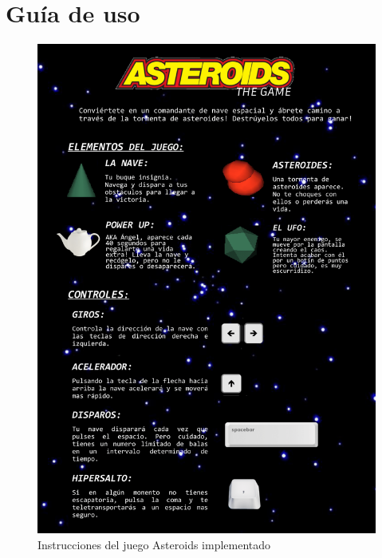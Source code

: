 \section{Guía de uso}

\begin{figure}[H]
    \centering
    \includegraphics[width=\textwidth]{fotos/instructions.png}
    \caption{Instrucciones del juego Asteroids implementado}
    \label{instrucciones}
\end{figure}